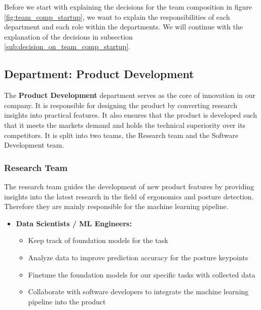\p
Before we start with explaining the decisions for the team composition in figure \ref{fig:team_comp_startup}, we want to explain the responsibilities of each department and each role within the departments.
We will continue with the explanation of the decisions in subsection \ref{sub:decision_on_team_comp_startup}.

\subsection{Department: Product Development}
The \textbf{Product Development} department serves as the core of innovation in our company.
It is responsible for designing the product by converting research insights into practical features.
It also ensures that the product is developed such that it meets the markets demand and holds the technical superiority over its competitors.
It is split into two teams, the Research team and the Software Development team.

\subsubsection*{Research Team}
The research team guides the development of new product features by providing insights into the latest research in the field of ergonomics and posture detection.
Therefore they are mainly responsible for the machine learning pipeline.
\begin{itemize}
    \item \textbf{Data Scientists / ML Engineers:}
            \begin{itemize}
                \item Keep track of foundation models for the task
                \item Analyze data to improve prediction accuracy for the posture keypoints
                \item Finetune the foundation models for our specific tasks with collected data
                \item Collaborate with software developers to integrate the machine learning pipeline into the product
            \end{itemize}
\end{itemize}

